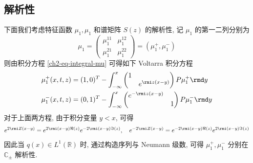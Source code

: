 \subsection{解析性}
下面我们考虑特征函数 $ \mu_{1}, \mu_{1} $ 和谱矩阵 $ S(z) $ 的解析性, 记 $ \mu_{1} $ 的第一二列分别为
\begin{equation}
    \mu_{1} =
    \begin{pmatrix}
        \mu_{1}^{11} & \mu_{1}^{12} \\ \mu_{1}^{21} & \mu_{1}^{22}
    \end{pmatrix} = (\mu_{1}^{+}, \mu_{1}^{-}) \label{ch2-eq-mu-1-matrix}
\end{equation}
则由积分方程 \eqref{ch2-eq-integral-mu} 可得如下 Voltarra 积分方程
\begin{align}
    \mu_{1}^{+}(x,t,z) & = (1,0)^T - \int^{x}_{-\infty}  \begin{pmatrix} 1 &  \\  & e^{ \rmi z (x - y)} \end{pmatrix} P \mu_{1}^{+} \rmd y \label{ch2-eq-Voltarra-mu-1} \\
    \mu_{1}^{-}(x,t,z) & = (0,1)^T - \int^{x}_{-\infty}  \begin{pmatrix} e^{-\rmi z (x - y)} &  \\  & 1 \end{pmatrix} P \mu_{1}^{-} \rmd y \label{ch2-eq-Voltarra-mu-2}
\end{align}
对于上面两方程, 由于积分变量 $ y < x $, 可得
\begin{equation*}
    e^{2 \rmi Z (x-y)} = e^{2 \rmi (x-y)\Re(z)}  e^{-2 \rmi (x-y)\Im(z)}, \quad   e^{- 2 \rmi Z (x-y)} = e^{- 2 \rmi (x-y)\Re(z)}  e^{2 \rmi (x-y)\Im(z)}
\end{equation*}
因此当 $ q(x) \in L^{1}(\mathbb{R}) $ 时, 通过构造序列与 Neumann 级数, 可得 $ \mu_{1}^{+}, \mu_{1}^{-} $ 分别在 $ \mathbb{C}_{\pm} $ 解析性.

